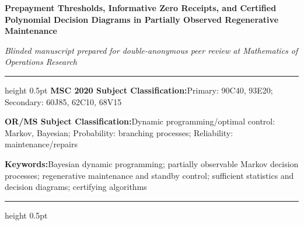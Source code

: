 \documentclass[11pt,letterpaper]{article}
\begin{document}
\thispagestyle{plain}
\nolinenumbers
\vspace*{18pt}
\begin{flushleft}
{\fontsize{17.5}{22.5}\selectfont\bfseries Prepayment Thresholds,
Informative Zero Receipts, and Certified Polynomial Decision Diagrams in
Partially Observed Regenerative Maintenance\par}
\vspace{14pt}
{\normalsize\emph{Blinded manuscript prepared for double-anonymous peer review at Mathematics of Operations Research}\par}
\end{flushleft}
\vspace{16pt}
\hrule height 0.5pt
\vspace{14pt}
\noindent\textbf{MSC 2020 Subject Classification:}\quad Primary: 90C40,
93E20; Secondary: 60J85, 62C10, 68V15\par
\vspace{8pt}
\noindent\textbf{OR/MS Subject Classification:}\quad Dynamic
programming/optimal control: Markov, Bayesian; Probability: branching
processes; Reliability: maintenance/repairs\par
\vspace{8pt}
\noindent\textbf{Keywords:}\quad Bayesian dynamic programming; partially
observable Markov decision processes; regenerative maintenance and
standby control; sufficient statistics and decision diagrams; certifying
algorithms\par
\vspace{14pt}
\hrule height 0.5pt
\vfill
{}
\clearpage
\end{document}

